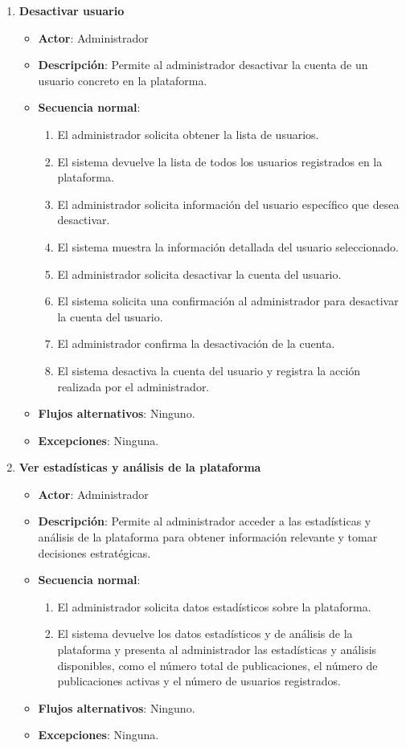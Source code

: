 \begin{enumerate}[label=UC-\protect\twodigits{\arabic*}:, align=left, leftmargin=*]
\item \textbf{Desactivar usuario}
\begin{itemize}
\item \textbf{Actor}: Administrador
\item \textbf{Descripción}: Permite al administrador desactivar la cuenta de un usuario concreto en la plataforma.
\item \textbf{Secuencia normal}:
\begin{enumerate}[label={\arabic*}:]
\item El administrador solicita obtener la lista de usuarios.
\item El sistema devuelve la lista de todos los usuarios registrados en la plataforma.
\item El administrador solicita información del usuario específico que desea desactivar.
\item El sistema muestra la información detallada del usuario seleccionado.
\item El administrador solicita desactivar la cuenta del usuario.
\item El sistema solicita una confirmación al administrador para desactivar la cuenta del usuario.
\item El administrador confirma la desactivación de la cuenta.
\item El sistema desactiva la cuenta del usuario y registra la acción realizada por el administrador.
\end{enumerate}
\item \textbf{Flujos alternativos}: Ninguno.
\item \textbf{Excepciones}: Ninguna.
\end{itemize}

\item \textbf{Ver estadísticas y análisis de la plataforma}
\begin{itemize}
\item \textbf{Actor}: Administrador
\item \textbf{Descripción}: Permite al administrador acceder a las estadísticas y análisis de la plataforma para obtener información relevante y tomar decisiones estratégicas.
\item \textbf{Secuencia normal}:
\begin{enumerate}[label={\arabic*}:]
\item El administrador solicita datos estadísticos sobre la plataforma.
\item El sistema devuelve los datos estadísticos y de análisis de la plataforma y presenta al administrador las estadísticas y análisis disponibles, como el número total de publicaciones, el número de publicaciones activas y el número de usuarios registrados.
\end{enumerate}
\item \textbf{Flujos alternativos}: Ninguno.
\item \textbf{Excepciones}: Ninguna.
\end{itemize} 


\end{enumerate}
